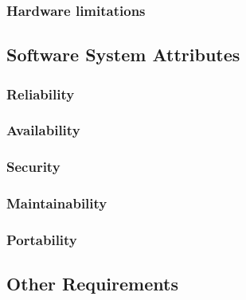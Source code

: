 \documentclass[a4paper,11pt]{report} %
\begin{document}
	\subsubsection{Hardware limitations}
	
	\subsection{Software System Attributes}
	
	\subsubsection{Reliability}
	
	\subsubsection{Availability}
	
	\subsubsection{Security}
	
	\subsubsection{Maintainability}

	\subsubsection{Portability}
	
	\subsection{Other Requirements}
	
	
\end{document}
